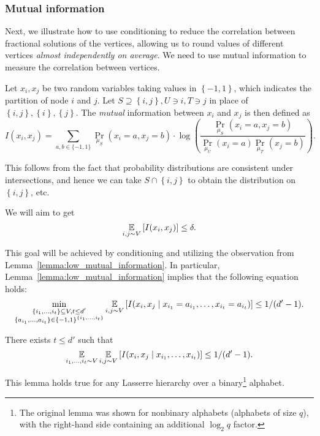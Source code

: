 \subsubsection{Mutual information}
\label{subsection:information_theory}
Next, we illustrate how to use conditioning to reduce the correlation between fractional solutions of the vertices, allowing us to round values of different vertices \emph{almost independently on average}. 
We need to use mutual information to measure the correlation between vertices.
\begin{definition}
	Let $x_i,x_j$ be two random variables taking values in $\left \{-1,1\right\}$, which indicates the partition of node $i$ and $j$.
    Let $S \supseteq \left \{i,j\right\},U \ni i,T \ni j$ in place of $\left \{i,j\right\}, \left \{i\right\}, \left \{j\right\}$. The \emph{mutual} information between $x_i$ and $x_j$ is then defined as 
	\begin{equation*}
		I(x_i,x_j) =  \sum_{a,b \in \{-1,1\}} \Pr_{\mu_S}(x_i=a,x_j=b) \cdot \log\left(\frac{\Pr_{\mu_S}(x_i=a,x_j=b)}{\Pr_{\mu_U}(x_i=a)\Pr_{\mu_T}(x_j=b)}\right) .
	\end{equation*}
\end{definition}
This follows from the fact that probability distributions are consistent under intersections, and hence we can take $S \cap \left \{i,j\right\}$  to obtain the 
distribution on $\left \{i,j\right\}$, etc. \par
We will aim to get 
\begin{equation*}
	\operatorname*{\mathbb{E}}_{i,j \sim V} \left[ I(x_i, x_j)\right] \leq \delta.
\end{equation*}

This goal will be achieved by conditioning and utilizing the observation from Lemma~\ref{lemma:low_mutual_information}.
In particular, Lemma~\ref{lemma:low_mutual_information} implies that the
following equation holds:
\begin{equation}
\label{eq:multral-info-goal}
\min_{\substack{\{i_1, \ldots, i_t\} \subseteq V, t \leq d' \\ \{a_{i_1}, \ldots, a_{i_t}\} \in \{-1, 1\}^{\{i_1, \ldots, i_t\}}}} \operatorname*{\mathbb{E}} _{i,j \sim V}\left[ I(x_i,x_j \mid x_{i_1} = a_{i_1},\ldots,x_{i_t} = a_{i_t}) \right] \leq 1/(d'-1).
\end{equation}

\begin{lemma}
\label{lemma:low_mutual_information}
		There exists $t \leq d'$ such that 
		\begin{equation*}
			\operatorname*{\mathbb{E}}_{i_1,\hdots,i_t \sim V} \operatorname*{\mathbb{E}} _{i,j \sim V}\left[ I(x_i,x_j \mid x_{i_1},\hdots,x_{i_t}) \right] \leq 1/(d'-1).
		\end{equation*}
\end{lemma}
This lemma holds true for any Lasserre hierarchy over a binary\footnote{The original lemma was shown for nonbinary alphabets (alphabets of size $q$), with the right-hand side containing an additional $\log_2 q$ factor. }  alphabet. 


